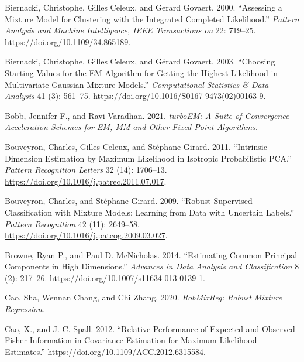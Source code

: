 \begin{CSLReferences}{1}{0}
\leavevmode{}%
Biernacki, Christophe, Gilles Celeux, and Gerard Govaert. 2000. {``Assessing a {Mixture Model} for {Clustering} with the {Integrated Completed Likelihood}.''} \emph{Pattern Analysis and Machine Intelligence, IEEE Transactions on} 22: 719--25. \url{https://doi.org/10.1109/34.865189}.

\leavevmode{}%
Biernacki, Christophe, Gilles Celeux, and Gérard Govaert. 2003. {``Choosing Starting Values for the {EM} Algorithm for Getting the Highest Likelihood in Multivariate {Gaussian} Mixture Models.''} \emph{Computational Statistics \& Data Analysis} 41 (3): 561--75. \url{https://doi.org/10.1016/S0167-9473(02)00163-9}.

\leavevmode{}%
Bobb, Jennifer F., and Ravi Varadhan. 2021. \emph{turboEM: A Suite of Convergence Acceleration Schemes for EM, MM and Other Fixed-Point Algorithms}.

\leavevmode{}%
Bouveyron, Charles, Gilles Celeux, and Stéphane Girard. 2011. {``Intrinsic {Dimension Estimation} by {Maximum Likelihood} in {Isotropic Probabilistic PCA}.''} \emph{Pattern Recognition Letters} 32 (14): 1706--13. \url{https://doi.org/10.1016/j.patrec.2011.07.017}.

\leavevmode{}%
Bouveyron, Charles, and Stéphane Girard. 2009. {``{Robust Supervised Classification} with {Mixture Models}: {Learning} from {Data} with {Uncertain Labels}.''} \emph{Pattern Recognition} 42 (11): 2649--58. \url{https://doi.org/10.1016/j.patcog.2009.03.027}.

\leavevmode{}%
Browne, Ryan P., and Paul D. McNicholas. 2014. {``Estimating Common Principal Components in High Dimensions.''} \emph{Advances in Data Analysis and Classification} 8 (2): 217--26. \url{https://doi.org/10.1007/s11634-013-0139-1}.

\leavevmode{}%
Cao, Sha, Wennan Chang, and Chi Zhang. 2020. \emph{RobMixReg: Robust Mixture Regression}.

\leavevmode{}%
Cao, X., and J. C. Spall. 2012. {``Relative Performance of Expected and Observed Fisher Information in Covariance Estimation for Maximum Likelihood Estimates.''} \url{https://doi.org/10.1109/ACC.2012.6315584}.


\end{CSLReferences}
